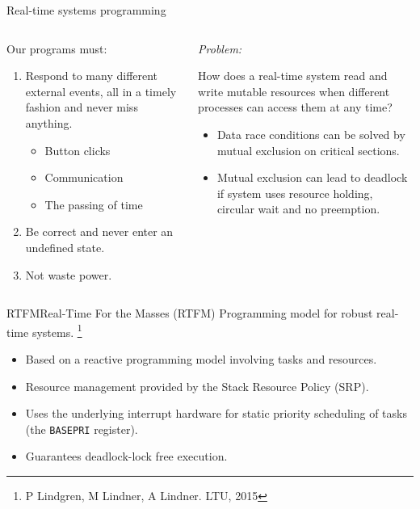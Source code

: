 \documentclass[
  aspectratio=169,
]{beamer}
\begin{document}
\begin{frame}{Real-time systems programming}{}
\begin{columns}[T] %
\hfill%
\begin{column}{.5\textwidth}
Our programs must:
\begin{enumerate}
  \item Respond to many different external events, all in a timely fashion and never miss anything.
	\begin{itemize}
	  \item Button clicks
	  \item Communication
	  \item The passing of time
	\end{itemize}
  \item Be correct and never enter an undefined state.
  \item Not waste power.
\end{enumerate}
\end{column}%
\hfill%
\begin{column}{.5\textwidth}
\emph{Problem:}

How does a real-time system read and write mutable resources when different processes can access them at any time?
\begin{itemize}
  \item \alert{Data race} conditions can be solved by mutual exclusion on critical sections.
  \item Mutual exclusion can lead to \alert{deadlock} if system uses resource holding, circular wait and no preemption.
\end{itemize}
\end{column}%
\end{columns}
\end{frame}

\begin{frame}{RTFM}{Real-Time For the Masses (RTFM)}
Programming model for robust real-time systems. \footnote{P Lindgren, M Lindner, A Lindner.  LTU, 2015}
\begin{itemize}
  \item Based on a reactive programming model involving \alert{tasks} and \alert{resources}.
  \item Resource management provided by the \alert{Stack Resource Policy} (SRP).
  \item Uses the underlying interrupt hardware for static priority scheduling of tasks (the \texttt{BASEPRI} register).
  \item Guarantees \alert{deadlock-lock free} execution.
\end{itemize}
\end{frame}
\end{document}
